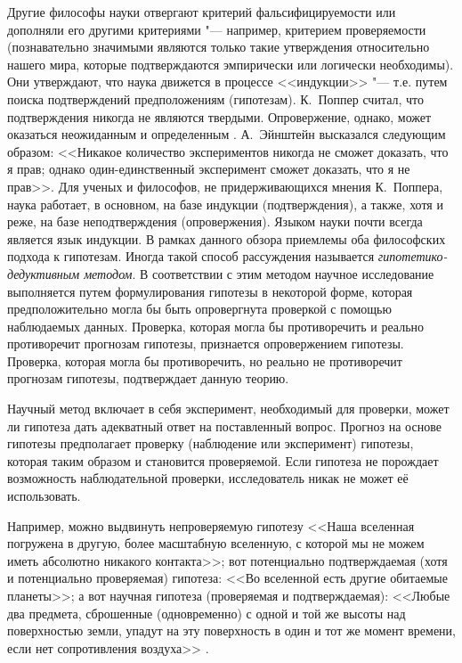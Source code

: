 Другие философы науки отвергают критерий фальсифицируемости или дополняли его другими критериями "--- 
например, критерием проверяемости (познавательно значимыми являются только такие утверждения 
относительно нашего мира, которые подтверждаются эмпирически или логически необходимы). 
Они утверждают, что наука движется в процессе <<индукции>> "--- т.е. путем поиска подтверждений предположениям 
(гипотезам). К.~Поппер считал, что подтверждения 
никогда не являются твердыми. Опровержение, однако, может оказаться неожиданным и определенным \cite{Popper2005}. 
А.~Эйнштейн высказался следующим образом: <<Никакое количество экспериментов никогда не сможет доказать, что я прав; 
однако один-единственный эксперимент сможет доказать, что я не прав>>. Для ученых и философов, не придерживающихся 
мнения К.~Поппера, наука работает, в основном, на базе индукции (подтверждения), а также, хотя и реже, на базе 
неподтверждения (опровержения). Языком науки почти всегда является язык индукции. В рамках данного обзора приемлемы 
оба философских подхода к гипотезам. Иногда такой способ рассуждения называется 
\textit{гипотетико-дедуктивным методом}. В соответствии с этим методом научное исследование выполняется путем 
формулирования гипотезы в некоторой форме, которая предположительно могла бы быть опровергнута проверкой с помощью 
наблюдаемых данных. Проверка, которая могла бы противоречить и реально противоречит прогнозам гипотезы, признается 
опровержением гипотезы. Проверка, которая могла бы противоречить, но реально не противоречит прогнозам гипотезы, 
подтверждает данную теорию.

Научный метод включает в себя эксперимент, необходимый для проверки, может ли гипотеза дать адекватный ответ на 
поставленный вопрос. Прогноз на основе гипотезы предполагает проверку (наблюдение или эксперимент) гипотезы, которая 
таким образом и становится проверяемой. Если гипотеза не порождает возможность наблюдательной проверки, исследователь 
никак не может её использовать.

Например, можно выдвинуть непроверяемую гипотезу <<Наша вселенная погружена в другую, более масштабную вселенную, с 
которой мы не можем иметь абсолютно никакого контакта>>; вот потенциально подтверждаемая (хотя и потенциально 
проверяемая) гипотеза: <<Во вселенной есть другие обитаемые планеты>>; а вот научная гипотеза (проверяемая и 
подтверждаемая): <<Любые два предмета, сброшенные (одновременно) с одной и той же высоты над поверхностью земли, 
упадут на эту поверхность в один и тот же момент времени, если нет сопротивления воздуха>> \cite{Stanbrough2022}.

